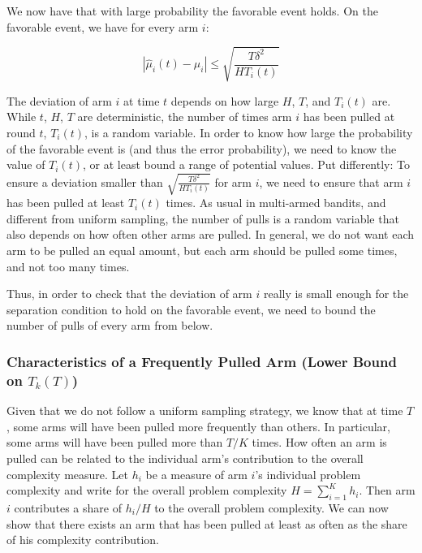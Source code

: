 \documentclass[12pt,]{article}
\begin{document}
We now have that with large probability the favorable event holds. On
the favorable event, we have for every arm \(i\):

\[
| \hat{\mu}_i(t) - \mu_i| \leq \sqrt{\frac{T\delta^2}{HT_i(t)}}
\]

The deviation of arm \(i\) at time \(t\) depends on how large \(H\),
\(T\), and \(T_i(t)\) are. While \(t\), \(H\), \(T\) are deterministic,
the number of times arm \(i\) has been pulled at round \(t\),
\(T_i(t)\), is a random variable. In order to know how large the
probability of the favorable event is (and thus the error probability),
we need to know the value of \(T_i(t)\), or at least bound a range of
potential values. Put differently: To ensure a deviation smaller than
\(\sqrt{\frac{T\delta^2}{HT_i(t)}}\) for arm \(i\), we need to ensure
that arm \(i\) has been pulled at least \(T_i(t)\) times. As usual in
multi-armed bandits, and different from uniform sampling, the number of
pulls is a random variable that also depends on how often other arms are
pulled. In general, we do not want each arm to be pulled an equal
amount, but each arm should be pulled some times, and not too many
times.

Thus, in order to check that the deviation of arm \(i\) really is small
enough for the separation condition to hold on the favorable event, we
need to bound the number of pulls of every arm from below.

\subsubsection{\texorpdfstring{Characteristics of a Frequently Pulled
Arm (Lower Bound on
\(T_k(T)\))}{Characteristics of a Frequently Pulled Arm (Lower Bound on T\_k(T))}}\label{characteristics-of-a-frequently-pulled-arm-lower-bound-on-t_kt}

Given that we do not follow a uniform sampling strategy, we know that at
time \(T\), some arms will have been pulled more frequently than others.
In particular, some arms will have been pulled more than \(T/K\) times.
How often an arm is pulled can be related to the individual arm's
contribution to the overall complexity measure. Let \(h_i\) be a measure
of arm \(i\)'s individual problem complexity and write for the overall
problem complexity \(H = \sum_{i = 1}^{K} h_i\). Then arm \(i\)
contributes a share of \(h_i/H\) to the overall problem complexity. We
can now show that there exists an arm that has been pulled at least as
often as the share of his complexity contribution.
\end{document}

